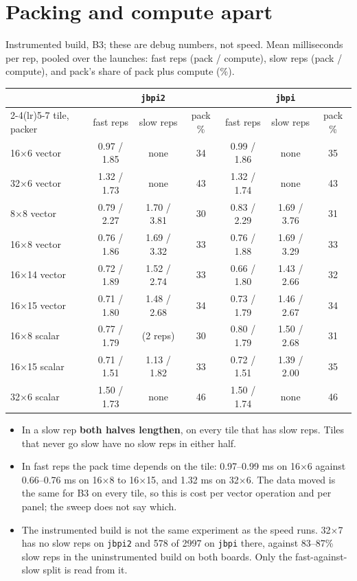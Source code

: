 \documentclass[10pt,a4paper]{article}
\begin{document}
\section{Packing and compute apart}
\label{sec:packvcompute}
Instrumented build, B3; these are debug numbers, not speed. Mean milliseconds per rep, pooled over the launches: fast
reps (pack / compute), slow reps (pack / compute), and pack's share of pack plus compute (\%).

\begin{center}\footnotesize\setlength{\tabcolsep}{3pt}
\begin{tabular}{@{}lcccccc@{}}
\toprule
 & \multicolumn{3}{c}{\texttt{jbpi2}} & \multicolumn{3}{c}{\texttt{jbpi}} \\
\cmidrule(lr){2-4}\cmidrule(lr){5-7}
tile, packer & fast reps & slow reps & pack \% & fast reps & slow reps & pack \% \\
\midrule
16$\times$6 vector & 0.97 / 1.85 & none & 34 & 0.99 / 1.86 & none & 35 \\
32$\times$6 vector & 1.32 / 1.73 & none & 43 & 1.32 / 1.74 & none & 43 \\
8$\times$8 vector & 0.79 / 2.27 & 1.70 / 3.81 & 30 & 0.83 / 2.29 & 1.69 / 3.76 & 31 \\
16$\times$8 vector & 0.76 / 1.86 & 1.69 / 3.32 & 33 & 0.76 / 1.88 & 1.69 / 3.29 & 33 \\
16$\times$14 vector & 0.72 / 1.89 & 1.52 / 2.74 & 33 & 0.66 / 1.80 & 1.43 / 2.66 & 32 \\
16$\times$15 vector & 0.71 / 1.80 & 1.48 / 2.68 & 34 & 0.73 / 1.79 & 1.46 / 2.67 & 34 \\
16$\times$8 scalar & 0.77 / 1.79 & (2 reps) & 30 & 0.80 / 1.79 & 1.50 / 2.68 & 31 \\
16$\times$15 scalar & 0.71 / 1.51 & 1.13 / 1.82 & 33 & 0.72 / 1.51 & 1.39 / 2.00 & 35 \\
32$\times$6 scalar & 1.50 / 1.73 & none & 46 & 1.50 / 1.74 & none & 46 \\
\bottomrule
\end{tabular}
\end{center}
\begin{itemize}
  \item In a slow rep \textbf{both halves lengthen}, on every tile that has slow reps. Tiles that never go slow have no
  slow reps in either half.
  \item In fast reps the pack time depends on the tile: 0.97--0.99 ms on 16$\times$6 against 0.66--0.76 ms on
  16$\times$8 to 16$\times$15, and 1.32 ms on 32$\times$6. The data moved is the same for B3 on every tile, so this is
  cost per vector operation and per panel; the sweep does not say which.
  \item The instrumented build is not the same experiment as the speed runs. 32$\times$7 has no slow reps on
  \texttt{jbpi2} and 578 of 2997 on \texttt{jbpi} there, against 83--87\% slow reps in the uninstrumented build on
  both boards. Only the fast-against-slow split is read from it.
\end{itemize}
\end{document}
